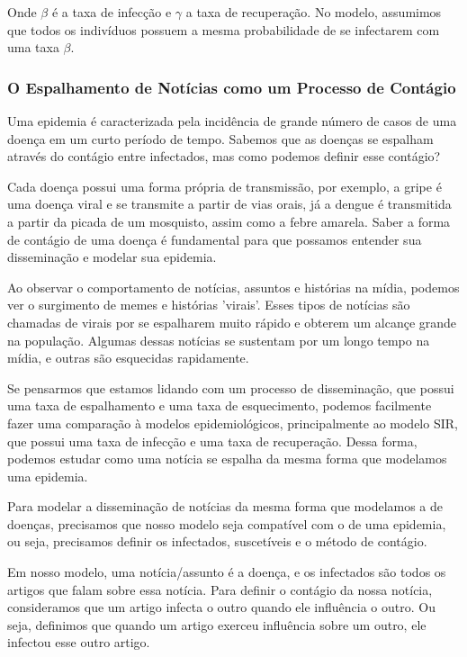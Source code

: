 \documentclass[a4paper,12pt]{article}
\begin{document}
\vspace{0.3cm}

Onde $\beta$ é a taxa de infecção e $\gamma$ a taxa de recuperação. No modelo, assumimos que todos os indivíduos possuem a mesma probabilidade
de se infectarem com uma taxa $\beta$.


\subsubsection{O Espalhamento de Notícias como um Processo de Contágio}

Uma epidemia é caracterizada pela incidência de grande número de casos de uma doença em um curto período de tempo. Sabemos que as doenças
se espalham através do contágio entre infectados, mas como podemos definir esse contágio? 

Cada doença possui uma forma própria de transmissão, por exemplo, a gripe é uma doença viral e se transmite a partir de vias orais, já a dengue
é transmitida a partir da picada de um mosquisto, assim como a febre amarela. Saber a forma de contágio de uma doença é fundamental para que
possamos entender sua disseminação e modelar sua epidemia.

Ao observar o comportamento de notícias, assuntos e histórias na mídia, podemos ver o surgimento de memes e histórias 'virais'. Esses 
tipos de notícias são chamadas de virais por se espalharem muito rápido e obterem um alcançe grande na população. Algumas dessas notícias
se sustentam por um longo tempo na mídia, e outras são esquecidas rapidamente. 

Se pensarmos que estamos lidando com um processo de disseminação, que possui uma taxa de espalhamento e uma taxa de esquecimento, podemos
facilmente fazer uma comparação à modelos epidemiológicos, principalmente ao modelo SIR, que possui uma taxa de infecção e
uma taxa de recuperação. Dessa forma, podemos estudar como uma notícia se espalha da mesma forma que modelamos uma epidemia.

Para modelar a disseminação de notícias da mesma forma que modelamos a de doenças, precisamos
que nosso modelo seja compatível com o de uma epidemia, ou seja, precisamos definir os infectados, suscetíveis e o método de contágio.

Em nosso modelo, uma notícia/assunto é a doença, e os infectados são todos os artigos que falam sobre essa notícia. 
Para definir o contágio da nossa notícia, consideramos que um artigo infecta o outro quando ele influência o outro. Ou seja,
definimos que quando um artigo exerceu influência sobre um outro, ele infectou esse outro artigo. 
\end{document}
